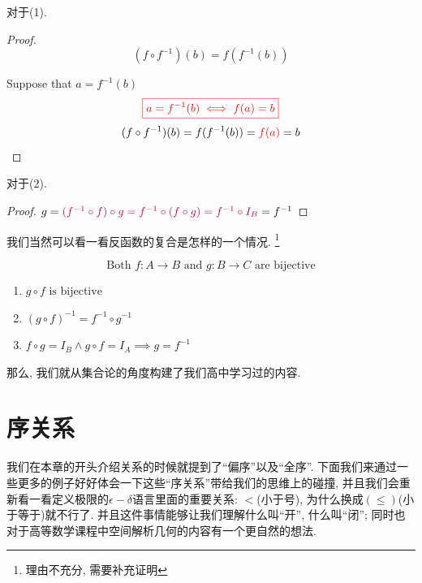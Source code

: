 对于(1). 
\begin{proof}
  \[
    (f \circ f^{-1})(b) = f(f^{-1}(b))
  \]

    Suppose that $a = f^{-1}(b)$
    \[
      \textcolor{red}{\boxed{a = f^{-1}(b) \iff f(a) = b}}
    \]
    \[
    (f \circ f^{-1})(b) = f(f^{-1}(b)) = \textcolor{red}{f(a)} = b
  \]
\end{proof}

对于(2).
\begin{proof}
  $g = \textcolor{purple}{(f^{-1} \circ f) \circ g = f^{-1} \circ (f \circ g) = f^{-1} \circ I_B} = f^{-1}$
\end{proof}

我们当然可以看一看反函数的复合是怎样的一个情况. \footnote{理由不充分, 需要补充证明}

\begin{theorem}
  \[
    \text{Both } f: A \to B \text{ and } g: B \to C \text{ are bijective}
  \]

  \begin{enumerate}
    \item $g \circ f \text{ is bijective}$
    \item $(g \circ f)^{-1} = f^{-1} \circ g^{-1}$
    \item $f \circ g = I_B \land g \circ f = I_A \implies g = f^{-1}$
  \end{enumerate}
\end{theorem}

那么, 我们就从集合论的角度构建了我们高中学习过的内容. 

\section{序关系}

我们在本章的开头介绍关系的时候就提到了``偏序''以及``全序''. 下面我们来通过一些更多的例子好好体会一下这些``序关系''带给我们的思维上的碰撞, 并且我们会重新看一看定义极限的$\epsilon-\delta$语言里面的重要关系: $<$(小于号), 为什么换成$(\leq)$(小于等于)就不行了. 并且这件事情能够让我们理解什么叫``开'', 什么叫``闭''; 同时也对于高等数学课程中空间解析几何的内容有一个更自然的想法. 

